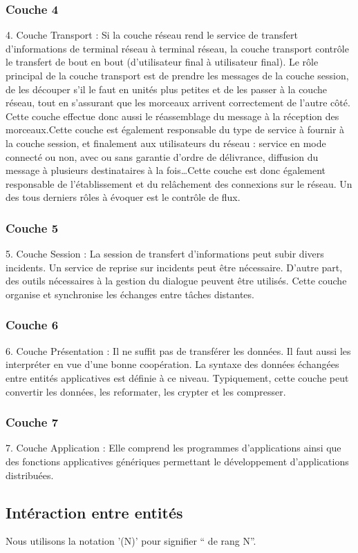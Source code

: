 \subsubsection{Couche 4}
4. Couche Transport : Si la couche réseau rend le service de transfert d'informations de terminal réseau à terminal réseau, la couche transport contrôle le transfert de bout en bout (d'utilisateur final à utilisateur final). Le rôle principal de la couche transport est de prendre les messages de la couche session, de les découper s'il le faut en unités plus petites et de les passer à la couche réseau, tout en s'assurant que les morceaux arrivent correctement de l'autre côté. Cette couche effectue donc aussi le réassemblage du message à la réception des morceaux.Cette couche est également responsable du type de service à fournir à la couche session, et finalement aux utilisateurs du réseau : service en mode connecté ou non, avec ou sans garantie d'ordre de délivrance, diffusion du message à plusieurs destinataires à la fois\ldots Cette couche est donc également responsable de l'établissement et du relâchement des connexions sur le réseau. Un des tous derniers rôles à évoquer est le contrôle de flux.
\subsubsection{Couche 5}
5. Couche Session : La session de transfert d'informations peut subir divers incidents. Un service de reprise sur incidents peut être nécessaire. D'autre part, des outils nécessaires à la gestion du dialogue peuvent être utilisés. Cette couche organise et synchronise les échanges entre tâches distantes.
\subsubsection{Couche 6}
6. Couche Présentation : Il ne suffit pas de transférer les données. Il faut aussi les interpréter en vue d'une bonne coopération. La syntaxe des données échangées entre entités applicatives est définie à ce niveau. Typiquement, cette couche peut convertir les données, les reformater, les crypter et les compresser.
\subsubsection{Couche 7}
7. Couche Application : Elle comprend les programmes d'applications ainsi que des fonctions applicatives génériques permettant le développement d'applications distribuées.

\subsection{Intéraction entre entités}
Nous utilisons la notation '(N)' pour signifier `` de rang N''.

